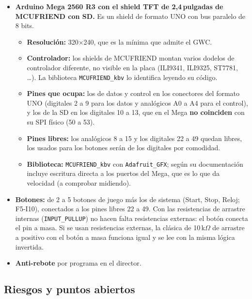 \begin{itemize}
	\item \textbf{Arduino Mega 2560 R3 con el shield TFT de 2,4\,pulgadas de MCUFRIEND con SD.} Es un shield de formato UNO con bus paralelo de 8 bits. 
	\begin{itemize}
		\item \textbf{Resolución:} 320$\times$240, que es la mínima que admite el GWC.
		\item \textbf{Controlador:} los shields de MCUFRIEND montan varios dodelos de controlador diferente, no visible en la placa (ILI9341, ILI9325, ST7781, \ldots). La biblioteca \texttt{MCUFRIEND\_kbv} lo identifica leyendo su código.
		\item \textbf{Pines que ocupa:} los de datos y control en los conectores del formato UNO (digitales 2 a 9 para los datos y analógicos A0 a A4 para el control), y los de la SD en los digitales 10 a 13, que en el Mega \textbf{no coinciden} con su SPI físico (50 a 53). 
		\item \textbf{Pines libres:} los analógicos 8 a 15 y los digitales 22 a 49 quedan libres, los usados para los botones serán de los digitales por comodidad.
		\item \textbf{Biblioteca:} \texttt{MCUFRIEND\_kbv} con \texttt{Adafruit\_GFX}; según su documentación incluye escritura directa a los puertos del Mega, que es lo que da velocidad (a comprobar midiendo).
	\end{itemize}
	\item \textbf{Botones:} de 2 a 5 botones de juego más los de sistema (Start, Stop, Reloj; F5-I10), conectados a los pines libres 22 a 49. Con las resistencias de arrastre internas (\texttt{INPUT\_PULLUP}) no hacen falta resistencias externas: el botón conecta el pin a masa. Si se usan resistencias externas, la clásica de 10\,k$\Omega$ de arrastre a positivo con el botón a masa funciona igual y se lee con la misma lógica invertida.
	\item \textbf{Anti-rebote} por programa en el director.
\end{itemize}

\subsection{Riesgos y puntos abiertos}
\label{sec:F6I01Abiertos}

